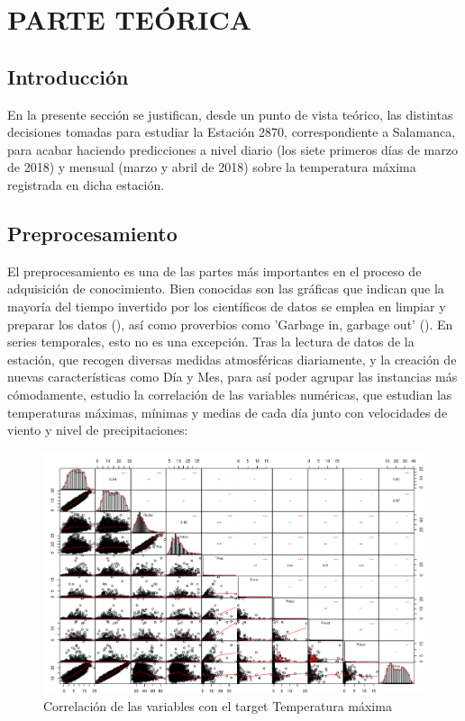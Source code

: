 \section{PARTE TEÓRICA}

\subsection{Introducción}

En la presente sección se justifican, desde un punto de vista teórico, las distintas decisiones tomadas para estudiar la Estación 2870, correspondiente a Salamanca, para acabar haciendo predicciones a nivel diario (los siete primeros días de marzo de 2018) y mensual (marzo y abril de 2018) sobre la temperatura máxima registrada en dicha estación. 

\subsection{Preprocesamiento}

El preprocesamiento es una de las partes más importantes en el proceso de adquisición de conocimiento. Bien conocidas son las gráficas que indican que la mayoría del tiempo invertido por los científicos de datos se emplea en limpiar y preparar los datos (\cite{prep-time}), así como proverbios como 'Garbage in, garbage out' (\cite{gigo}). En series temporales, esto no es una excepción. Tras la lectura de datos de la estación, que recogen diversas medidas atmosféricas diariamente, y la creación de nuevas características como Día y Mes, para así poder agrupar las instancias más cómodamente, estudio la correlación de las variables numéricas, que estudian las temperaturas máximas, mínimas y medias de cada día junto con velocidades de viento y nivel de precipitaciones:

\begin{figure}[H] %
	\centering
	\includegraphics[scale=0.4]{correlation.png}  %
	\caption{Correlación de las variables con el target Temperatura máxima} 
	\label{fig:corr}
\end{figure}

